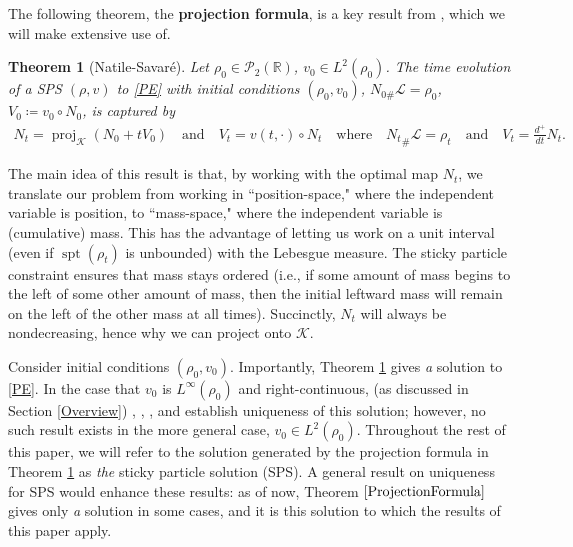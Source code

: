 \documentclass[11pt]{article}
\newtheorem{thm}{Theorem}[section]
\numberwithin{equation}{section}
\DeclareMathOperator{\spt}{spt}
\DeclareMathOperator{\proj}{proj}
\begin{document}
    The following theorem, the \textbf{projection formula}, is a key result from \cite{Natile-Savare}, which we will make extensive use of. 
    \begin{thm}[Natile-Savaré]\label{ProjectionFormula}
        {Let $\rho_0\in\mathcal{P}_2(\mathbb{R})$, $v_0\in L^2(\rho_0)$. The time evolution of a SPS $(\rho, v)$ to \eqref{PE} with initial conditions $(\rho_0, v_0)$, $N_{0\#}\mathcal{L}=\rho_0$, $V_0\coloneq v_0\circ N_0$, is captured by 
        \begin{align*}
            N_t=\proj_{\mathcal{K}}(N_0+tV_0) \quad \text{and} \quad V_t=v(t,\cdot)\circ N_t \quad \text{where} \quad {N_t}_\#\mathcal{L}=\rho_t \quad\text{and}\quad V_t=\frac{d^+}{dt}N_t. 
        \end{align*}}
    \end{thm}
    The main idea of this result is that, by working with the optimal map $N_t$, we translate our problem from working in ``position-space," where the independent variable is position, to ``mass-space," where the independent variable is (cumulative) mass. 
    This has the advantage of letting us work on a unit interval (even if $\spt(\rho_t)$ is unbounded) with the Lebesgue measure. The sticky particle constraint ensures that mass stays ordered (i.e., if some amount of mass begins to the left of some other amount of mass, then the initial leftward mass will remain on the left of the other mass at all times). Succinctly, $N_t$ will always be nondecreasing, hence why we can project onto $\mathcal K$. 

    Consider initial conditions $(\rho_0,v_0)$. Importantly, Theorem \ref{ProjectionFormula} gives \textit{a} solution to \eqref{PE}. In the case that $v_0$ is $L^\infty(\rho_0)$ and right-continuous, (as discussed in Section \ref{Overview}) \cite{BrenGren}, \cite{Huang-Wang}, \cite{Tudorascu-2008}, and \cite{Suder-Tudorascu} establish uniqueness of this solution; however, no such result exists in the more general case, $v_0\in L^2(\rho_0)$. Throughout the rest of this paper, we will refer to the solution generated by the projection formula in Theorem \ref{ProjectionFormula} as \textit{the} sticky particle solution (SPS). A general result on uniqueness for SPS would enhance these results: as of now, Theorem $\ref{ProjectionFormula}$ gives only \textit{a} solution in some cases, and it is this solution to which the results of this paper apply. 
    
\end{document}
